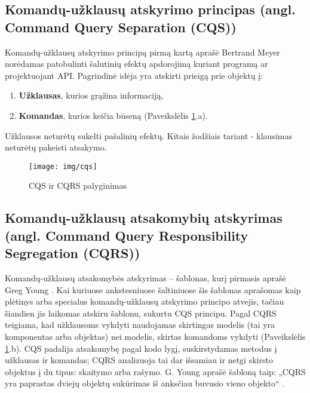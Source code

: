 \subsection{Komandų-užklausų atskyrimo principas (angl. Command Query Separation (CQS))}

Komandų-užklausų atskyrimo principą pirmą kartą aprašė Bertrand Meyer \cite{Meyer:1988:OSC:534929} norėdamas patobulinti šalutinių efektų apdorojimą kuriant programą ar projektuojant API. Pagrindinė idėja yra atskirti prieigą prie objektų į:

\begin{enumerate}

  \item \textbf{Užklausas}, kurios grąžina informaciją,

  \item \textbf{Komandas}, kurios keičia būseną (Paveikslėlis \ref{img:cqs}.a).

\end{enumerate}

Užklausos neturėtų sukelti pašalinių efektų. Kitais žodžiais tariant - klausimas neturėtų pakeisti atsakymo.

\begin{figure}[H]
    \centering
    \texttt{[image: img/cqs]}
    \caption{CQS ir CQRS palyginimas}
    \label{img:cqs}
\end{figure}

\subsection{Komandų-užklausų atsakomybių atskyrimas (angl. Command Query Responsibility Segregation (CQRS))}

Komandų-užklausų atsakomybės atskyrimas – šablonas, kurį pirmasis aprašė Greg Young \cite{Young:CQRS2013}. Kai kuriuose ankstesniuose šaltiniuose šis šablonas aprašomas kaip plėtinys arba specialus komandų-užklausų atskyrimo principo atvejis, tačiau šiandien jis laikomas atskiru šablonu, sukurtu CQS principu. Pagal CQRS teigiama, kad užklausoms vykdyti naudojamas skirtingas modelis (tai yra komponentas arba objektas) nei modelis, skirtas komandoms vykdyti (Paveikslėlis \ref{img:cqs}.b). CQS padalija atsakomybę pagal kodo lygį, suskirstydamas metodus į užklausas ir komandas; CQRS analizuoja tai dar išsamiau ir netgi skirsto objektus į du tipus: skaitymo arba rašymo. G. Young aprašė šabloną taip: „CQRS yra paprastas dviejų objektų sukūrimas iš anksčiau buvusio vieno objekto“ \cite{Young:CQRS2010}.


